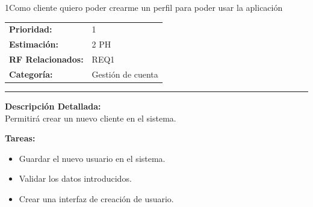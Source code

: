 \begin{hu_card}{1}{Como cliente quiero poder crearme un perfil para poder usar la aplicación}
    \begin{tabularx}{\linewidth}{l X}
        \textbf{Prioridad:}   & 1 \\
        \textbf{Estimación:}  & 2 PH \\
        \textbf{RF Relacionados:} & REQ1 \\
        \textbf{Categoría:} & Gestión de cuenta \\
    \end{tabularx}

    \vspace{2mm}
    \hrule
    \vspace{2mm}

    \textbf{Descripción Detallada:} \\
    Permitirá crear un nuevo cliente en el sistema.

    \vspace{2mm}
    \textbf{Tareas:}
    \begin{itemize}[noitemsep, topsep=0pt]
        \item Guardar el nuevo usuario en el sistema.
        \item Validar los datos introducidos.
        \item Crear una interfaz de creación de usuario.
    \end{itemize}


\end{hu_card}
